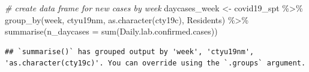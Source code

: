 \documentclass[
]{book}
\newenvironment{Shaded}{\begin{snugshade}}{\end{snugshade}}
\newcommand{\AttributeTok}[1]{\textcolor[rgb]{0.77,0.63,0.00}{#1}}
\newcommand{\CommentTok}[1]{\textcolor[rgb]{0.56,0.35,0.01}{\textit{#1}}}
\newcommand{\FunctionTok}[1]{\textcolor[rgb]{0.00,0.00,0.00}{#1}}
\newcommand{\NormalTok}[1]{#1}
\newcommand{\OtherTok}[1]{\textcolor[rgb]{0.56,0.35,0.01}{#1}}
\newcommand{\SpecialCharTok}[1]{\textcolor[rgb]{0.00,0.00,0.00}{#1}}
\begin{document}
\begin{Shaded}
\begin{Highlighting}[]
\CommentTok{\# create data frame for new cases by week}
\NormalTok{daycases\_week }\OtherTok{\textless{}{-}}\NormalTok{ covid19\_spt }\SpecialCharTok{\%\textgreater{}\%} \FunctionTok{group\_by}\NormalTok{(week, ctyu19nm, }\FunctionTok{as.character}\NormalTok{(cty19c), Residents) }\SpecialCharTok{\%\textgreater{}\%}
  \FunctionTok{summarise}\NormalTok{(}\AttributeTok{n\_daycases =} \FunctionTok{sum}\NormalTok{(Daily.lab.confirmed.cases)) }
\end{Highlighting}
\end{Shaded}

\begin{verbatim}
## `summarise()` has grouped output by 'week', 'ctyu19nm', 'as.character(cty19c)'. You can override using the `.groups` argument.
\end{verbatim}
\end{document}
